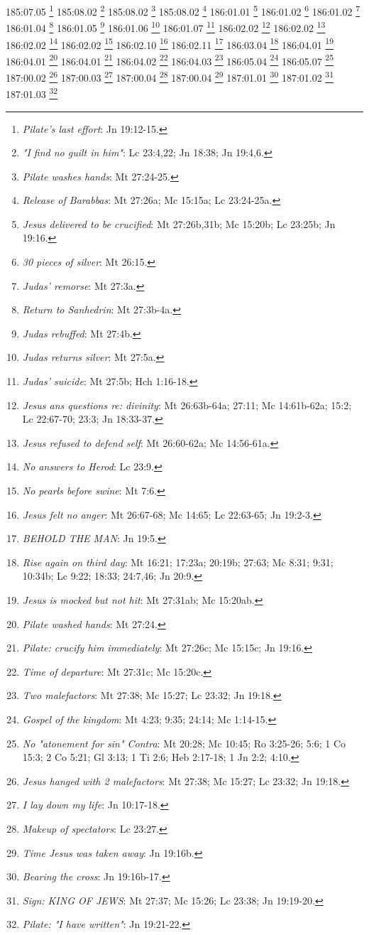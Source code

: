 185:07.05 \footnote{\textit{Pilate's last effort}: Jn 19:12-15.}
185:08.02 \footnote{\textit{"I find no guilt in him"}: Lc 23:4,22; Jn 18:38; Jn 19:4,6.}
185:08.02 \footnote{\textit{Pilate washes hands}: Mt 27:24-25.}
185:08.02 \footnote{\textit{Release of Barabbas}: Mt 27:26a; Mc 15:15a; Lc 23:24-25a.}
186:01.01 \footnote{\textit{Jesus delivered to be crucified}: Mt 27:26b,31b; Mc 15:20b; Lc 23:25b; Jn 19:16.}
186:01.02 \footnote{\textit{30 pieces of silver}: Mt 26:15.}
186:01.02 \footnote{\textit{Judas' remorse}: Mt 27:3a.}
186:01.04 \footnote{\textit{Return to Sanhedrin}: Mt 27:3b-4a.}
186:01.05 \footnote{\textit{Judas rebuffed}: Mt 27:4b.}
186:01.06 \footnote{\textit{Judas returns silver}: Mt 27:5a.}
186:01.07 \footnote{\textit{Judas' suicide}: Mt 27:5b; Hch 1:16-18.}
186:02.02 \footnote{\textit{Jesus ans questions re: divinity}: Mt 26:63b-64a; 27:11; Mc 14:61b-62a; 15:2; Lc 22:67-70; 23:3; Jn 18:33-37.}
186:02.02 \footnote{\textit{Jesus refused to defend self}: Mt 26:60-62a; Mc 14:56-61a.}
186:02.02 \footnote{\textit{No answers to Herod}: Lc 23:9.}
186:02.02 \footnote{\textit{No pearls before swine}: Mt 7:6.}
186:02.10 \footnote{\textit{Jesus felt no anger}: Mt 26:67-68; Mc 14:65; Lc 22:63-65; Jn 19:2-3.}
186:02.11 \footnote{\textit{BEHOLD THE MAN}: Jn 19:5.}
186:03.04 \footnote{\textit{Rise again on third day}: Mt 16:21; 17:23a; 20:19b; 27:63; Mc 8:31; 9:31; 10:34b; Lc 9:22; 18:33; 24:7,46; Jn 20:9.}
186:04.01 \footnote{\textit{Jesus is mocked but not hit}: Mt 27:31ab; Mc 15:20ab.}
186:04.01 \footnote{\textit{Pilate washed hands}: Mt 27:24.}
186:04.01 \footnote{\textit{Pilate: crucify him immediately}: Mt 27:26c; Mc 15:15c; Jn 19:16.}
186:04.02 \footnote{\textit{Time of departure}: Mt 27:31c; Mc 15:20c.}
186:04.03 \footnote{\textit{Two malefactors}: Mt 27:38; Mc 15:27; Lc 23:32; Jn 19:18.}
186:05.04 \footnote{\textit{Gospel of the kingdom}: Mt 4:23; 9:35; 24:14; Mc 1:14-15.}
186:05.07 \footnote{\textit{No "atonement for sin" Contra}: Mt 20:28; Mc 10:45; Ro 3:25-26; 5:6; 1 Co 15:3; 2 Co 5:21; Gl 3:13; 1 Ti 2:6; Heb 2:17-18; 1 Jn 2:2; 4:10.}
187:00.02 \footnote{\textit{Jesus hanged with 2 malefactors}: Mt 27:38; Mc 15:27; Lc 23:32; Jn 19:18.}
187:00.03 \footnote{\textit{I lay down my life}: Jn 10:17-18.}
187:00.04 \footnote{\textit{Makeup of spectators}: Lc 23:27.}
187:00.04 \footnote{\textit{Time Jesus was taken away}: Jn 19:16b.}
187:01.01 \footnote{\textit{Bearing the cross}: Jn 19:16b-17.}
187:01.02 \footnote{\textit{Sign: KING OF JEWS}: Mt 27:37; Mc 15:26; Lc 23:38; Jn 19:19-20.}
187:01.03 \footnote{\textit{Pilate: "I have written"}: Jn 19:21-22.}
